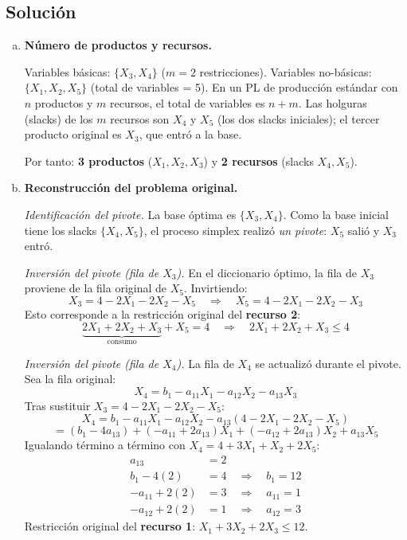 \documentclass{article}
\begin{document}
\subsection*{Solución}

\begin{enumerate}[a)]

\item \textbf{Número de productos y recursos.}

Variables básicas: $\{X_3,X_4\}$ ($m=2$ restricciones). Variables no-básicas: $\{X_1,X_2,X_5\}$ (total de variables = 5). En un PL de producción estándar con $n$ productos y $m$ recursos, el total de variables es $n+m$. Las holguras (slacks) de los $m$ recursos son $X_4$ y $X_5$ (los dos slacks iniciales); el tercer producto original es $X_3$, que entró a la base.

Por tanto: \textbf{3 productos} ($X_1,X_2,X_3$) y \textbf{2 recursos} (slacks $X_4,X_5$).

\item \textbf{Reconstrucción del problema original.}

\textit{Identificación del pivote.} La base óptima es $\{X_3,X_4\}$. Como la base inicial tiene los slacks $\{X_4,X_5\}$, el proceso simplex realizó \emph{un pivote}: $X_5$ salió y $X_3$ entró.

\textit{Inversión del pivote (fila de $X_3$).} En el diccionario óptimo, la fila de $X_3$ proviene de la fila original de $X_5$. Invirtiendo:
$$X_3 = 4 - 2X_1 - 2X_2 - X_5 \quad\Longrightarrow\quad X_5 = 4 - 2X_1 - 2X_2 - X_3$$
Esto corresponde a la restricción original del \textbf{recurso 2}:
$$\underbrace{2X_1 + 2X_2 + X_3}_{\text{consumo}} + X_5 = 4 \quad\Longrightarrow\quad 2X_1+2X_2+X_3 \leq 4$$

\textit{Inversión del pivote (fila de $X_4$).} La fila de $X_4$ se actualizó durante el pivote. Sea la fila original:
$$X_4 = b_1 - a_{11}X_1 - a_{12}X_2 - a_{13}X_3$$
Tras sustituir $X_3 = 4-2X_1-2X_2-X_5$:
$$X_4 = b_1 - a_{11}X_1 - a_{12}X_2 - a_{13}(4-2X_1-2X_2-X_5)$$
$$= (b_1-4a_{13}) + (-a_{11}+2a_{13})X_1 + (-a_{12}+2a_{13})X_2 + a_{13}X_5$$
Igualando término a término con $X_4 = 4+3X_1+X_2+2X_5$:
\begin{align*}
a_{13} &= 2 \\
b_1 - 4(2) &= 4 \quad\Rightarrow\quad b_1=12 \\
-a_{11}+2(2)&= 3 \quad\Rightarrow\quad a_{11}=1 \\
-a_{12}+2(2)&= 1 \quad\Rightarrow\quad a_{12}=3
\end{align*}
Restricción original del \textbf{recurso 1}: $X_1+3X_2+2X_3 \leq 12$.


\end{enumerate}
\end{document}
